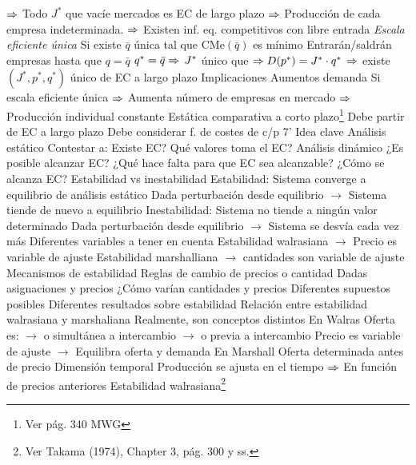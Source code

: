 \documentclass{nuevotema}
\begin{document}
\begin{esquemal}
				\4[] $\Rightarrow$ Todo $J^*$ que vacíe mercados es EC de largo plazo
				\4[] $\Rightarrow$ Producción de cada empresa indeterminada.
				\4[] $\Rightarrow$ Existen inf. eq. competitivos con libre entrada
				\4[] 
				\4 \textit{Escala eficiente única}
				\4[] Si existe $\bar{q}$ única tal que $\text{CMe}(\bar{q})$ es mínimo
				\4[] Entrarán/saldrán empresas hasta que $q=\bar{q}$
				\4[] $q^*=\bar{q} \Rightarrow \, J^*$ único que $\Rightarrow D(p^*) = J^* \cdot q^*$
				\4[] $\Rightarrow$ existe $(J^*, p^*, q^*)$ único de EC a largo plazo
				\4[] 
		\2 Implicaciones
			\3 Aumentos demanda
				\4 Si escala eficiente única
				\4[] $\Rightarrow$ Aumenta número de empresas en mercado
				\4[] $\Rightarrow$ Producción individual constante
			\3 Estática comparativa a corto plazo\footnote{Ver pág. 340 MWG}
				\4 Debe partir de EC a largo plazo
				\4 Debe considerar f. de costes de c/p
	\1  7'
		\2 Idea clave
			\3 Análisis estático
				\4 Contestar a:
				\4[] Existe EC?
				\4[] Qué valores toma el EC?
			\3 Análisis dinámico
				\4 ¿Es posible alcanzar EC?
				\4 ¿Qué hace falta para que EC sea alcanzable?
				\4 ¿Cómo se alcanza EC?
			\3 Estabilidad vs inestabilidad
				\4 Estabilidad:
				\4[] Sistema converge a equilibrio de análisis estático
				\4[] Dada perturbación desde equilibrio
				\4[] $\to$ Sistema tiende de nuevo a equilibrio
				\4 Inestabilidad:
				\4[] Sistema no tiende a ningún valor determinado
				\4[] Dada perturbación desde equilibrio
				\4[] $\to$ Sistema se desvía cada vez más
				\4[] 
				\4 Diferentes variables a tener en cuenta
				\4[] Estabilidad walrasiana
				\4[] $\to$ Precio es variable de ajuste
				\4[] Estabilidad marshalliana
				\4[] $\to$ cantidades son variable de ajuste
			\3 Mecanismos de estabilidad
				\4 Reglas de cambio de precios o cantidad
				\4 Dadas asignaciones y precios
				\4[] ¿Cómo varían cantidades y precios
				\4[$\to$] Diferentes supuestos posibles
				\4[$\to$] Diferentes resultados sobre estabilidad
			\3 Relación entre estabilidad walrasiana y marshaliana
				\4 Realmente, son conceptos distintos
				\4 En Walras
				\4[] Oferta es:
				\4[] $\to$ o simultánea a intercambio
				\4[] $\to$ o previa a intercambio
				\4[] Precio es variable de ajuste
				\4[] $\to$ Equilibra oferta y demanda
				\4 En Marshall
				\4[] Oferta determinada antes de precio
				\4[] Dimensión temporal
				\4[] Producción se ajusta en el tiempo
				\4[] $\Rightarrow$ En función de precios anteriores
		\2 Estabilidad walrasiana\footnote{Ver Takama (1974), Chapter 3, pág. 300 y ss.}

\end{esquemal}
\end{document}
